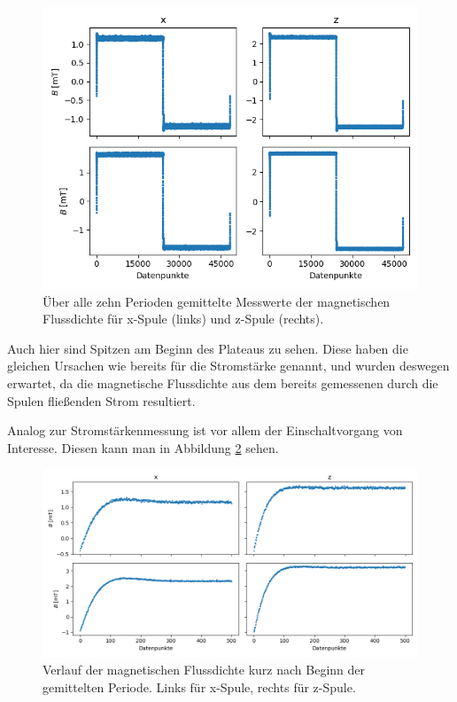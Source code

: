 \documentclass[page,pdftex,12pt,a4paper,twoside,openright]{scrbook}
\begin{document}
\begin{figure}[H]
\centering
\includegraphics[width=\textwidth]{img/mag_avg.png}
\caption{\label{fig-mag_avg}
Über alle zehn Perioden gemittelte Messwerte der magnetischen Flussdichte für x-Spule (links) und z-Spule (rechts).}
\end{figure}

Auch hier sind Spitzen am Beginn des Plateaus zu sehen. Diese haben die gleichen Ursachen wie bereits für die Stromstärke genannt, und wurden deswegen erwartet, da die magnetische Flussdichte aus dem bereits gemessenen durch die Spulen fließenden Strom resultiert.

Analog zur Stromstärkenmessung ist vor allem der Einschaltvorgang von Interesse. Diesen kann man in Abbildung \ref{fig-mag_anfang} sehen.

\begin{figure}[H]
\centering
\includegraphics[width=\textwidth]{img/mag_anfang.png}
\caption{\label{fig-mag_anfang}
Verlauf der magnetischen Flussdichte kurz nach Beginn der gemittelten Periode. Links für x-Spule, rechts für z-Spule.}
\end{figure}
\end{document}

